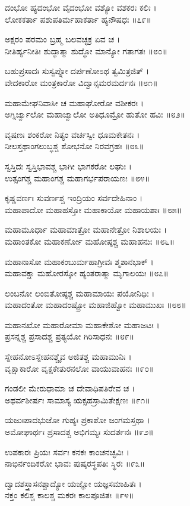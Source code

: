 ದಂಭೋ ಹ್ಯದಂಭೋ ವೈದಂಭೋ ವಶ್ಯೋ ವಶಕರಃ ಕಲಿಃ ।\\
ಲೋಕಕರ್ತಾ ಪಶುಪತಿರ್ಮಹಾಕರ್ತಾ ಹ್ಯನೌಷಧಃ ॥೭೯॥

ಅಕ್ಷರಂ ಪರಮಂ ಬ್ರಹ್ಮ ಬಲವಚ್ಛಕ್ರ ಏವ ಚ ।\\
ನೀತಿರ್ಹ್ಯನೀತಿಃ ಶುದ್ಧಾತ್ಮಾ ಶುದ್ಧೋ ಮಾನ್ಯೋ ಗತಾಗತಃ ॥೮೦॥

ಬಹುಪ್ರಸಾದಃ ಸುಸ್ವಪ್ನೋ ದರ್ಪಣೋಽಥ ತ್ವಮಿತ್ರಜಿತ್ ।\\
ವೇದಕಾರೋ ಮಂತ್ರಕಾರೋ ವಿದ್ವಾನ್ಸಮರಮರ್ದನಃ ॥೮೧॥

ಮಹಾಮೇಘನಿವಾಸೀ ಚ ಮಹಾಘೋರೋ ವಶೀಕರಃ ।\\
ಅಗ್ನಿರ್ಜ್ವಾಲೋ ಮಹಾಜ್ವಾಲೋ ಅತಿಧೂಮ್ರೋ ಹುತೋ ಹವಿಃ ॥೮೨॥

ವೃಷಣಃ ಶಂಕರೋ ನಿತ್ಯಂ ವರ್ಚಸ್ವೀ ಧೂಮಕೇತನಃ ।\\
ನೀಲಸ್ತಥಾಂಗಲುಬ್ಧಶ್ಚ ಶೋಭನೋ ನಿರವಗ್ರಹಃ ॥೮೩॥

ಸ್ವಸ್ತಿದಃ ಸ್ವಸ್ತಿಭಾವಶ್ಚ ಭಾಗೀ ಭಾಗಕರೋ ಲಘುಃ ।\\
ಉತ್ಸಂಗಶ್ಚ ಮಹಾಂಗಶ್ಚ ಮಹಾಗರ್ಭಪರಾಯಣಃ ॥೮೪॥

ಕೃಷ್ಣವರ್ಣಃ ಸುವರ್ಣಶ್ಚ ಇಂದ್ರಿಯಂ ಸರ್ವದೇಹಿನಾಂ ।\\
ಮಹಾಪಾದೋ ಮಹಾಹಸ್ತೋ ಮಹಾಕಾಯೋ ಮಹಾಯಶಾಃ ॥೮೫॥

ಮಹಾಮೂರ್ಧಾ ಮಹಾಮಾತ್ರೋ ಮಹಾನೇತ್ರೋ ನಿಶಾಲಯಃ ।\\
ಮಹಾಂತಕೋ ಮಹಾಕರ್ಣೋ ಮಹೋಷ್ಠಶ್ಚ ಮಹಾಹನುಃ ॥೮೬॥

ಮಹಾನಾಸೋ ಮಹಾಕಂಬುರ್ಮಹಾಗ್ರೀವಃ ಶ್ಮಶಾನಭಾಕ್ ।\\
ಮಹಾವಕ್ಷಾ ಮಹೋರಸ್ಕೋ ಹ್ಯಂತರಾತ್ಮಾ ಮೃಗಾಲಯಃ ॥೮೭॥

ಲಂಬನೋ ಲಂಬಿತೋಷ್ಠಶ್ಚ ಮಹಾಮಾಯಃ ಪಯೋನಿಧಿಃ ।\\
ಮಹಾದಂತೋ ಮಹಾದಂಷ್ಟ್ರೋ ಮಹಾಜಿಹ್ವೋ ಮಹಾಮುಖಃ ॥೮೮॥

ಮಹಾನಖೋ ಮಹಾರೋಮಾ ಮಹಾಕೇಶೋ ಮಹಾಜಟಃ ।\\
ಪ್ರಸನ್ನಶ್ಚ ಪ್ರಸಾದಶ್ಚ ಪ್ರತ್ಯಯೋ ಗಿರಿಸಾಧನಃ ॥೮೯॥

ಸ್ನೇಹನೋಽಸ್ನೇಹನಶ್ಚೈವ ಅಜಿತಶ್ಚ ಮಹಾಮುನಿಃ ।\\
ವೃಕ್ಷಾಕಾರೋ ವೃಕ್ಷಕೇತುರನಲೋ ವಾಯುವಾಹನಃ ॥೯೦॥

ಗಂಡಲೀ ಮೇರುಧಾಮಾ ಚ ದೇವಾಧಿಪತಿರೇವ ಚ ।\\
ಅಥರ್ವಶೀರ್ಷಃ ಸಾಮಾಸ್ಯ ಋಕ್ಸಹಸ್ರಾಮಿತೇಕ್ಷಣಃ ॥೯೧॥

ಯಜುಃಪಾದಭುಜೋ ಗುಹ್ಯಃ ಪ್ರಕಾಶೋ ಜಂಗಮಸ್ತಥಾ ।\\
ಅಮೋಘಾರ್ಥಃ ಪ್ರಸಾದಶ್ಚ ಅಭಿಗಮ್ಯಃ ಸುದರ್ಶನಃ ॥೯೨॥

ಉಪಕಾರಃ ಪ್ರಿಯಃ ಸರ್ವಃ ಕನಕಃ ಕಾಂಚನಚ್ಛವಿಃ ।\\
ನಾಭಿರ್ನಂದಿಕರೋ ಭಾವಃ ಪುಷ್ಕರಸ್ಥಪತಿಃ ಸ್ಥಿರಃ ॥೯೩॥

ದ್ವಾದಶಸ್ತ್ರಾಸನಶ್ಚಾದ್ಯೋ ಯಜ್ಞೋ ಯಜ್ಞಸಮಾಹಿತಃ ।\\
ನಕ್ತಂ ಕಲಿಶ್ಚ ಕಾಲಶ್ಚ ಮಕರಃ ಕಾಲಪೂಜಿತಃ ॥೯೪॥

